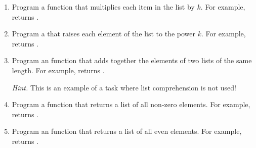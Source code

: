 \documentclass[11pt,class=report,crop=false]{standalone}
\begin{document}
\begin{activite}


\begin{enumerate}
  \item Program a  function that multiplies each item in the list by $k$. For example,  returns \ci{[2,4,6,8,10]}.
  
  \item Program a  that raises each element of the list to the power $k$. For example,  returns \ci{[1,8,27,64,125]}.
  
  \item Program an  function that adds together the elements of two lists of the same length. For example,  returns \ci{[5,7,9]}.
  
  \emph{Hint.} This is an example of a task where list comprehension is not used!
  

  \item Program a  function that returns a list of all non-zero elements. For example,  returns \ci{[1,2,3,4,5]}.
  
  \item Program an  function that returns a list of all even elements. For example,  returns \ci{[0,2,0,4,0]}.
  
\end{enumerate}

\end{activite}



\end{document}
